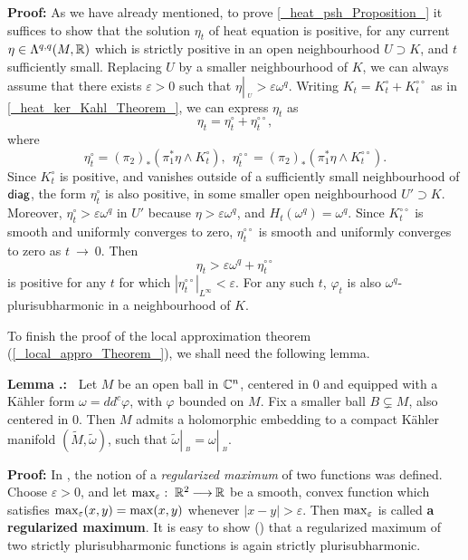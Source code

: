 \documentclass[11pt]{article}
\numberwithin{equation}{section}
\newcommand{\arrow}{{\:\longrightarrow\:}}
\newcommand{\C}{{\Bbb C}}
\newcommand{\R}{{\Bbb R}}
\newcommand{\6}{\partial}
\newcommand{\restrict}[1]{{\left|_{{\phantom{|}\!\!}_{#1}}\right.}}
\renewcommand{\tilde}{\widetilde}
\renewcommand{\phi}{\varphi}
\renewcommand{\epsilon}{\varepsilon}
\renewcommand{\max}{{\rm max}}
\newcommand{\diag}{\operatorname{\sf diag}}
\newcounter{Mycounter}[section]
\newcounter{lemma}[section]
\renewcommand{\thelemma}{{Lemma \thesection.\arabic{lemma}}}
\newcommand{\lemma}{%
    \setcounter{lemma}{\value{Mycounter}}
    \refstepcounter{lemma}
    \stepcounter{Mycounter}
    {\noindent \bf \thelemma:\ }}
\newcounter{theorem}[section]
\def\blacksquare{\hbox{\vrule width 5pt height 5pt depth 0pt}}
\def\endproof{\blacksquare}
\begin{document}
\hfill

{\bf Proof:} As we have already mentioned,
to prove \ref{_heat_psh_Proposition_}
it suffices to show that the solution
$\eta_t$  of heat equation is positive, for any
current $\eta\in \Lambda^{q,q}(M, \R)$ which is strictly positive in an open 
neighbourhood $U \supset K$, and $t$ sufficiently small. Replacing
$U$ by a smaller neighbourhood of $K$, we can
always assume that there exists $\epsilon >0$ 
such that $\eta\restrict U > \epsilon \omega^q$.
Writing $K_t = K_t^\circ
  +K_t^{\circ\circ}$ as in \ref{_heat_ker_Kahl_Theorem_},
we can express $\eta_t$ as
\[
\eta_t= \eta_t^\circ + \eta_t^{\circ\circ},
\]
where 
\[
\eta_t^\circ = (\pi_2)_*(\pi_1^* \eta\wedge K_t^\circ),\ \ 
\eta_t^{\circ\circ} = (\pi_2)_*(\pi_1^* \eta\wedge K_t^{\circ\circ}).
\]
Since $K^\circ_t$ is positive, and vanishes outside
of a sufficiently small neighbourhood of $\diag$, the form
$\eta^\circ_t$ is also positive, in some smaller
open neighbourhood $U'\supset K$. Moreover, 
$\eta ^\circ_t > \epsilon \omega^q$ in $U'$
because $\eta > \epsilon \omega^q$, and $H_t(\omega^q)=\omega^q$.
Since $K_t^{\circ\circ}$ is smooth and uniformly
converges to zero,  $\eta_t^{\circ\circ}$ is smooth and 
uniformly converges to zero as $t\arrow 0$. 
Then
\[
\eta_t > \epsilon \omega^q+ \eta_t^{\circ\circ}
\]
is positive for any $t$ for which $|\eta_t^{\circ\circ}|_{L^\infty} < \epsilon$.
For any such $t$, $\phi_t$ is also
$\omega^q$-plurisubharmonic in a neighbourhood of $K$.
\endproof

\hfill

To finish the proof of the local approximation theorem
(\ref{_local_appro_Theorem_}), we shall need the following
lemma.

\hfill

\lemma\label{_open_iso_embe_Kahler_Lemma_}
Let $M$ be an open ball in $\C^n$, centered in 0 and 
equipped with a K\"ahler form $\omega = dd^c \phi$, 
with $\phi$ bounded on $M$. Fix a smaller ball $B
\subsetneq M$, also centered in 0. Then $M$
admits a holomorphic embedding to a compact
K\"ahler manifold $(\tilde M, \tilde \omega)$,
such that $\tilde \omega\restrict B = \omega\restrict B$.

\hfill

{\bf Proof:} In \cite{_Demailly_1982_}, the notion
of a {\em regularized maximum} of two functions was
defined. Choose $\epsilon >0$, and let 
$\max_\epsilon:\; \R^2\arrow \R$ be a smooth, convex
function which satisfies $\max_\epsilon(x, y) = \max(x,y)$
whenever $|x-y|>\epsilon$. Then $\max_\epsilon$ is called
{\bf a regularized maximum}. It is easy to show
(\cite{_Demailly_1982_}) that a regularized maximum
of two strictly plurisubharmonic functions is
again strictly plurisubharmonic.
\end{document}
